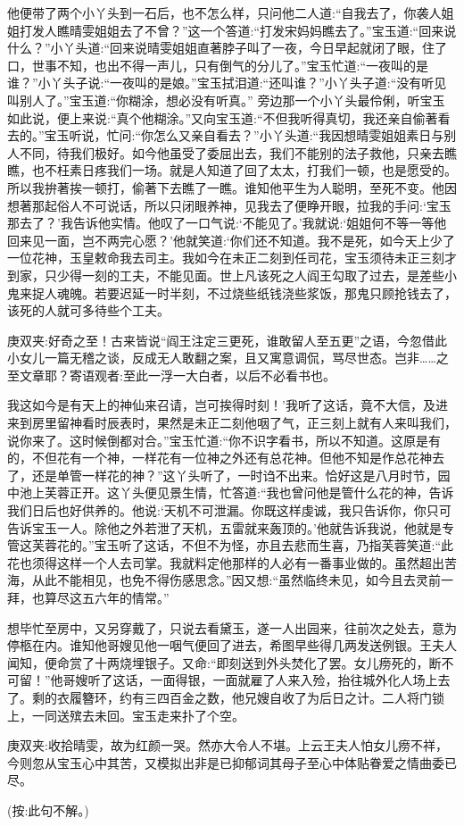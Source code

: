 \begin{parag}
    他便带了两个小丫头到一石后，也不怎么样，只问他二人道:“自我去了，你袭人姐姐打发人瞧晴雯姐姐去了不曾？”这一个答道:“打发宋妈妈瞧去了。”宝玉道:“回来说什么？”小丫头道:“回来说晴雯姐姐直著脖子叫了一夜，今日早起就闭了眼，住了口，世事不知，也出不得一声儿，只有倒气的分儿了。”宝玉忙道:“一夜叫的是谁？”小丫头子说:“一夜叫的是娘。”宝玉拭泪道:“还叫谁？”小丫头子道:“没有听见叫别人了。”宝玉道:“你糊涂，想必没有听真。” 旁边那一个小丫头最伶俐，听宝玉如此说，便上来说:“真个他糊涂。”又向宝玉道:“不但我听得真切，我还亲自偷著看去的。”宝玉听说，忙问:“你怎么又亲自看去？”小丫头道:“我因想晴雯姐姐素日与别人不同，待我们极好。如今他虽受了委屈出去，我们不能别的法子救他，只亲去瞧瞧，也不枉素日疼我们一场。就是人知道了回了太太，打我们一顿，也是愿受的。所以我拚著挨一顿打，偷著下去瞧了一瞧。谁知他平生为人聪明，至死不变。他因想著那起俗人不可说话，所以只闭眼养神，见我去了便睁开眼，拉我的手问:‘宝玉那去了？’我告诉他实情。他叹了一口气说:‘不能见了。’我就说:‘姐姐何不等一等他回来见一面，岂不两完心愿？’他就笑道:‘你们还不知道。我不是死，如今天上少了一位花神，玉皇敕命我去司主。我如今在未正二刻到任司花，宝玉须待未正三刻才到家，只少得一刻的工夫，不能见面。世上凡该死之人阎王勾取了过去，是差些小鬼来捉人魂魄。若要迟延一时半刻，不过烧些纸钱浇些浆饭，那鬼只顾抢钱去了，该死的人就可多待些个工夫。\begin{note}庚双夹:好奇之至！古来皆说“阎王注定三更死，谁敢留人至五更”之语，今忽借此小女儿一篇无稽之谈，反成无人敢翻之案，且又寓意调侃，骂尽世态。岂非……之至文章耶？寄语观者:至此一浮一大白者，以后不必看书也。\end{note}我这如今是有天上的神仙来召请，岂可挨得时刻！’我听了这话，竟不大信，及进来到房里留神看时辰表时，果然是未正二刻他咽了气，正三刻上就有人来叫我们，说你来了。这时候倒都对合。”宝玉忙道:“你不识字看书，所以不知道。这原是有的，不但花有一个神，一样花有一位神之外还有总花神。但他不知是作总花神去了，还是单管一样花的神？”这丫头听了，一时诌不出来。恰好这是八月时节，园中池上芙蓉正开。这丫头便见景生情，忙答道:“我也曾问他是管什么花的神，告诉我们日后也好供养的。他说:‘天机不可泄漏。你既这样虔诚，我只告诉你，你只可告诉宝玉一人。除他之外若泄了天机，五雷就来轰顶的。’他就告诉我说，他就是专管这芙蓉花的。”宝玉听了这话，不但不为怪，亦且去悲而生喜，乃指芙蓉笑道:“此花也须得这样一个人去司掌。我就料定他那样的人必有一番事业做的。虽然超出苦海，从此不能相见，也免不得伤感思念。”因又想:“虽然临终未见，如今且去灵前一拜，也算尽这五六年的情常。”
\end{parag}


\begin{parag}
    想毕忙至房中，又另穿戴了，只说去看黛玉，遂一人出园来，往前次之处去，意为停柩在内。谁知他哥嫂见他一咽气便回了进去，希图早些得几两发送例银。王夫人闻知，便命赏了十两烧埋银子。又命:“即刻送到外头焚化了罢。女儿痨死的，断不可留！”他哥嫂听了这话，一面得银，一面就雇了人来入殓，抬往城外化人场上去了。剩的衣履簪环，约有三四百金之数，他兄嫂自收了为后日之计。二人将门锁上，一同送殡去未回。宝玉走来扑了个空。\begin{note}庚双夹:收拾晴雯，故为红颜一哭。然亦大令人不堪。上云王夫人怕女儿痨不祥，今则忽从宝玉心中其苦，又模拟出非是已抑郁词其母子至心中体贴眷爱之情曲委已尽。\end{note}(按:此句不解。)
\end{parag}


